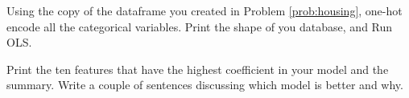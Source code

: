\begin{problem}

Using the copy of the dataframe you created in Problem \ref{prob:housing}, one-hot encode all the categorical variables.
Print the shape of you database, and Run OLS.

Print the ten features that have the highest coefficient in your model and the summary.
Write a couple of sentences discussing which model is better and why.

\end{problem}

\begin{comment}
\url{https://docs.google.com/spreadsheets/d/1oJBaH2x369leRtL19HD8n1oZlGqwK9Yz9b14ppUEhXg/edit#gid=439114268} birth quarter affects percentiles
\end{comment}